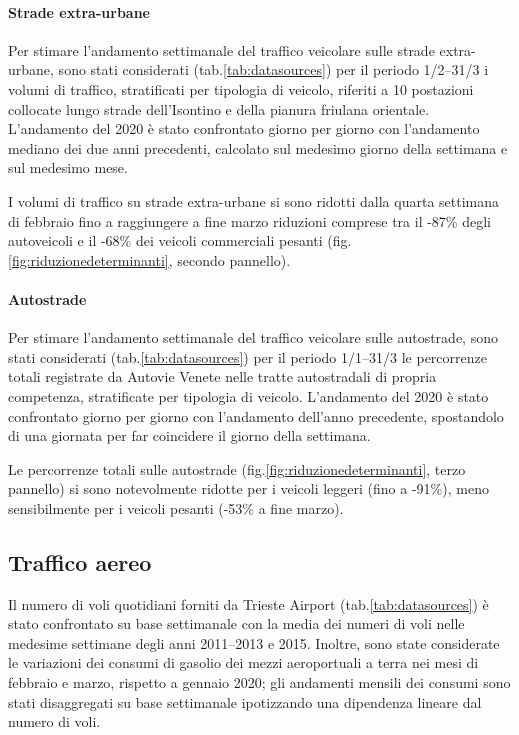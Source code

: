\paragraph{Strade extra-urbane}
Per stimare l'andamento settimanale del traffico veicolare sulle strade extra-urbane, sono stati considerati (tab.\ref{tab:datasources}) per il periodo 1/2--31/3 i volumi di traffico, stratificati per tipologia di veicolo, riferiti a 10 postazioni collocate lungo strade dell'Isontino e della pianura friulana orientale. L'andamento del 2020 è stato confrontato giorno per giorno con l'andamento mediano dei due anni precedenti, calcolato sul medesimo giorno della settimana e sul medesimo mese. 

I volumi di traffico su strade extra-urbane si sono ridotti dalla quarta settimana di febbraio fino a raggiungere a fine marzo riduzioni comprese tra il -87\% degli autoveicoli e il -68\% dei veicoli commerciali pesanti (fig.\ref{fig:riduzionedeterminanti}, secondo pannello).

\paragraph{Autostrade}
Per stimare l'andamento settimanale del traffico veicolare sulle autostrade, sono stati considerati (tab.\ref{tab:datasources}) per il periodo 1/1--31/3 le percorrenze totali registrate da Autovie Venete nelle tratte autostradali di propria competenza, stratificate per tipologia di veicolo. L'andamento del 2020 è stato confrontato giorno per giorno con l'andamento dell'anno precedente, spostandolo di una giornata per far coincidere il giorno della settimana.

Le percorrenze totali sulle autostrade (fig.\ref{fig:riduzionedeterminanti}, terzo pannello) si sono notevolmente ridotte per i veicoli leggeri (fino a -91\%), meno sensibilmente per i veicoli pesanti (-53\% a fine marzo).

\subsection{Traffico aereo}
Il numero di voli quotidiani forniti da Trieste Airport (tab.\ref{tab:datasources}) è stato confrontato su base settimanale con la media dei numeri di voli nelle medesime settimane degli anni 2011--2013 e 2015. Inoltre, sono state considerate le variazioni dei consumi di gasolio dei mezzi aeroportuali a terra nei mesi di febbraio e marzo, rispetto a gennaio 2020; gli andamenti mensili dei consumi sono stati disaggregati su base settimanale ipotizzando una dipendenza lineare dal numero di voli.

